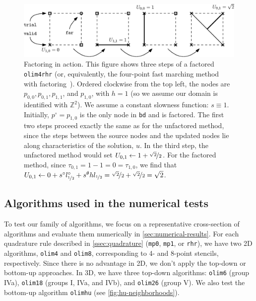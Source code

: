 \documentclass[eikonal.tex]{subfiles}
\begin{document}
\begin{figure}
  \centering
  \includegraphics{factoring-example.eps}
  \caption{Factoring in action. This figure shows three steps of a
    factored \texttt{olim4rhr} (or, equivalently, the four-point fast
    marching method with factoring~\cite{qi2018corner}). Ordered
    clockwise from the top left, the nodes are
    $p_{0, 0}, p_{0, 1}, p_{1, 1}$, and $p_{1, 0}$, with $h = 1$ (so
    we assume our domain is identified with $\mathbb{Z}^2$). We assume
    a constant slowness function: $s \equiv 1$. Initially,
    $p^\circ = p_{1, 0}$ is the only node in \texttt{bd} and is
    factored. The first two steps proceed exactly the same as for the
    unfactored method, since the steps between the source nodes and
    the updated nodes lie along characteristics of the solution,
    $u$. In the third step, the unfactored method would set
    $U_{0,1} \gets 1 + \nicefrac{\sqrt{2}}{2}$. For the factored
    method, since $\tau_{0,1} = 1 - 1 = 0 = \tau_{1,0}$, we find that
    $U_{0,1} \gets 0 + s^\circ l^\circ_{\nicefrac{1}{2}} + s^\theta h
    l_{\nicefrac{1}{2}} = \nicefrac{\sqrt{2}}{2} +
    \nicefrac{\sqrt{2}}{2} = \sqrt{2}$.}\label{fig:factoring-example}
\end{figure}

\subsection{Algorithms used in the numerical
  tests}\label{ssec:specific-algorithms}

To test our family of algorithms, we focus on a representative
cross-section of algorithms and evaluate them numerically in
\cref{sec:numerical-results}. For each quadrature rule described in
\cref{ssec:quadrature} (\texttt{mp0}, \texttt{mp1}, or \texttt{rhr}),
we have two 2D algorithms, \texttt{olim4} and \texttt{olim8},
corresponding to 4- and 8-point stencils, respectively. Since there is
no advantage in 2D, we don't apply the top-down or bottom-up
approaches. In 3D, we have three top-down algorithms: \texttt{olim6}
(group IVa), \texttt{olim18} (groups I, IVa, and IVb), and
\texttt{olim26} (group V). We also test the bottom-up algorithm
\texttt{olimhu} (see \cref{fig:hu-neighborhoods}).
\end{document}
